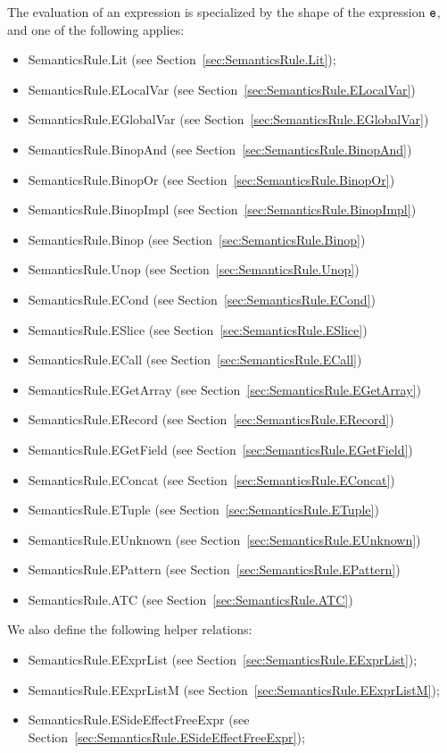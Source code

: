 \documentclass{book}
\begin{document}
The evaluation of an expression is specialized by the shape of the expression $\texttt{e}$,
and one of the following applies:
\begin{itemize}
\item SemanticsRule.Lit (see Section~\ref{sec:SemanticsRule.Lit});
\item SemanticsRule.ELocalVar (see Section~\ref{sec:SemanticsRule.ELocalVar})
\item SemanticsRule.EGlobalVar (see Section~\ref{sec:SemanticsRule.EGlobalVar})
\item SemanticsRule.BinopAnd (see Section~\ref{sec:SemanticsRule.BinopAnd})
\item SemanticsRule.BinopOr (see Section~\ref{sec:SemanticsRule.BinopOr})
\item SemanticsRule.BinopImpl (see Section~\ref{sec:SemanticsRule.BinopImpl})
\item SemanticsRule.Binop (see Section~\ref{sec:SemanticsRule.Binop})
\item SemanticsRule.Unop (see Section~\ref{sec:SemanticsRule.Unop})
\item SemanticsRule.ECond (see Section~\ref{sec:SemanticsRule.ECond})
\item SemanticsRule.ESlice (see Section~\ref{sec:SemanticsRule.ESlice})
\item SemanticsRule.ECall (see Section~\ref{sec:SemanticsRule.ECall})
\item SemanticsRule.EGetArray (see Section~\ref{sec:SemanticsRule.EGetArray})
\item SemanticsRule.ERecord (see Section~\ref{sec:SemanticsRule.ERecord})
\item SemanticsRule.EGetField (see Section~\ref{sec:SemanticsRule.EGetField})
\item SemanticsRule.EConcat (see Section~\ref{sec:SemanticsRule.EConcat})
\item SemanticsRule.ETuple (see Section~\ref{sec:SemanticsRule.ETuple})
\item SemanticsRule.EUnknown (see Section~\ref{sec:SemanticsRule.EUnknown})
\item SemanticsRule.EPattern (see Section~\ref{sec:SemanticsRule.EPattern})
\item SemanticsRule.ATC (see Section~\ref{sec:SemanticsRule.ATC})
\end{itemize}

We also define the following helper relations:
\begin{itemize}
  \item SemanticsRule.EExprList (see Section~\ref{sec:SemanticsRule.EExprList});
  \item SemanticsRule.EExprListM (see Section~\ref{sec:SemanticsRule.EExprListM});
  \item SemanticsRule.ESideEffectFreeExpr (see Section~\ref{sec:SemanticsRule.ESideEffectFreeExpr});
\end{itemize}
\end{document}
